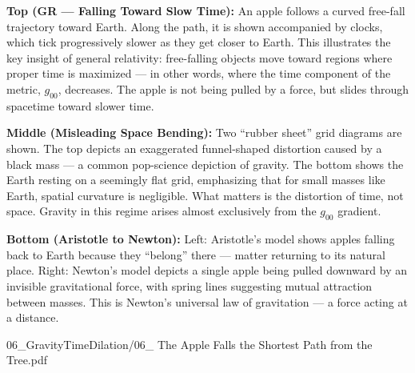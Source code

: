 \begin{SideNotePage}{
  \textbf{Top (GR — Falling Toward Slow Time):} An apple follows a curved free-fall trajectory toward Earth. Along the path, it is shown accompanied by clocks, which tick progressively slower as they get closer to Earth. This illustrates the key insight of general relativity: free-falling objects move toward regions where proper time is maximized — in other words, where the time component of the metric, $g_{00}$, decreases. The apple is not being pulled by a force, but slides through spacetime toward slower time.

  \textbf{Middle (Misleading Space Bending):} Two “rubber sheet” grid diagrams are shown. The top depicts an exaggerated funnel-shaped distortion caused by a black mass — a common pop-science depiction of gravity. The bottom shows the Earth resting on a seemingly flat grid, emphasizing that for small masses like Earth, spatial curvature is negligible. What matters is the distortion of time, not space. Gravity in this regime arises almost exclusively from the $g_{00}$ gradient.

  \textbf{Bottom (Aristotle to Newton):} Left: Aristotle’s model shows apples falling back to Earth because they “belong” there — matter returning to its natural place. Right: Newton’s model depicts a single apple being pulled downward by an invisible gravitational force, with spring lines suggesting mutual attraction between masses. This is Newton’s universal law of gravitation — a force acting at a distance.
}{06_GravityTimeDilation/06_ The Apple Falls the Shortest Path from the Tree.pdf}
\end{SideNotePage}